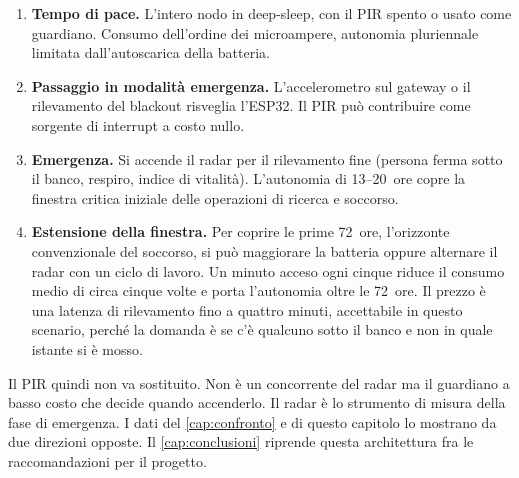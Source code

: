 \begin{enumerate}[leftmargin=1.8em,itemsep=3pt]
  \item \textbf{Tempo di pace.} L'intero nodo in deep-sleep, con il PIR spento o usato
        come guardiano. Consumo dell'ordine dei microampere, autonomia pluriennale
        limitata dall'autoscarica della batteria.
  \item \textbf{Passaggio in modalità emergenza.} L'accelerometro sul gateway o il
        rilevamento del blackout risveglia l'ESP32. Il PIR può contribuire come sorgente
        di interrupt a costo nullo.
  \item \textbf{Emergenza.} Si accende il radar per il rilevamento fine (persona ferma
        sotto il banco, respiro, indice di vitalità). L'autonomia di 13--20~ore copre la
        finestra critica iniziale delle operazioni di ricerca e soccorso.
  \item \textbf{Estensione della finestra.} Per coprire le prime 72~ore, l'orizzonte
        convenzionale del soccorso, si può maggiorare la batteria oppure alternare il
        radar con un ciclo di lavoro. Un minuto acceso ogni cinque riduce il consumo
        medio di circa cinque volte e porta l'autonomia oltre le 72~ore. Il prezzo è
        una latenza di rilevamento fino a quattro minuti, accettabile in questo
        scenario, perché la domanda è se c'è qualcuno sotto il banco e non in quale
        istante si è mosso.
\end{enumerate}

Il PIR quindi non va sostituito. Non è un concorrente del radar ma il guardiano a
basso costo che decide quando accenderlo. Il radar è lo strumento di misura della fase
di emergenza. I dati del \cref{cap:confronto} e di questo capitolo lo mostrano da due
direzioni opposte. Il \cref{cap:conclusioni} riprende questa architettura fra le
raccomandazioni per il progetto.
